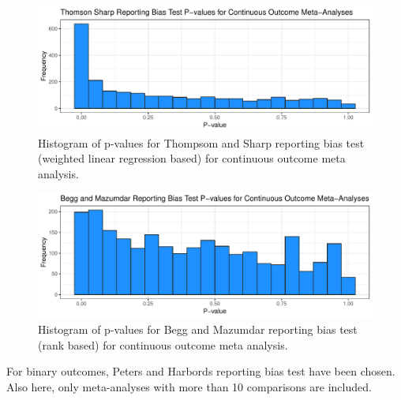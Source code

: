 \documentclass[11pt,a4paper,twoside]{book}\usepackage[]{graphicx}\usepackage[]{color}
\newenvironment{knitrout}{}{} %
\begin{document}
\begin{figure}
\begin{knitrout}
\color{fgcolor}

{\centering \includegraphics[width=\textwidth-3cm]{figure/ch02_figunnamed-chunk-18-1} 

}



\end{knitrout}
\caption{Histogram of p-values for Thompsom and Sharp reporting bias test (weighted linear regression based) for continuous outcome meta analysis.}
\label{thomson.cont}
\end{figure}

\begin{figure}
\begin{knitrout}
\color{fgcolor}

{\centering \includegraphics[width=\textwidth-3cm]{figure/ch02_figunnamed-chunk-19-1} 

}



\end{knitrout}
\caption{Histogram of p-values for Begg and Mazumdar reporting bias test (rank based) for continuous outcome meta analysis.}
\label{begg.cont}
\end{figure}


For binary outcomes, Peters and Harbords reporting bias test have been chosen. Also here, only meta-analyses with more than 10 comparisons are included.
\end{document}
